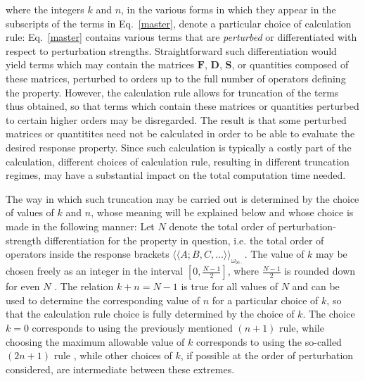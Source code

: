 \documentclass[%
 reprint,
 amsmath,amssymb,
 aps,
]{revtex4-1}
\begin{document}
where the integers $k$ and $n$, in the various forms in which they appear in the subscripts of the terms in Eq.~\eqref{master}, denote a particular choice of calculation rule: Eq.~\eqref{master} contains various terms that are \textit{perturbed} or differentiated with respect to perturbation strengths. Straightforward such differentiation would yield terms which may contain the matrices $\mathbf{F}$, $\mathbf{D}$, $\mathbf{S}$, or quantities composed of these matrices, perturbed to orders up to the full number of operators defining the property. However, the calculation rule allows for truncation of the terms thus obtained, so that terms which contain these matrices or quantities perturbed to certain higher orders may be disregarded. The result is that some perturbed matrices or quantitites need not be calculated in order to be able to evaluate the desired response property. Since such calculation is typically a costly part of the calculation, different choices of calculation rule, resulting in different truncation regimes, may have a substantial impact on the total computation time needed.

The way in which such truncation may be carried out is determined by the choice of values of $k$ and $n$, whose meaning will be explained below and whose choice is made in the following manner: Let $N$ denote the total order of perturbation-strength differentiation for the property in question, i.e. the total order of operators inside the response brackets $\langle \langle A ; B, C, \ldots \rangle \rangle_{\omega_{bc\cdots}}$. 
The value of $k$ may be chosen freely as an integer in the interval $\left[ 0, \frac{N - 1}{2} \right]$, where $\frac{N - 1}{2}$ is rounded down for even $N$ . The relation $k + n = N - 1$ is true for all values of $N$ and can be used to determine the corresponding value of $n$ for a particular choice of $k$, so that the calculation rule choice is fully determined by the choice of $k$. The choice $k = 0$ corresponds to using the previously mentioned $(n + 1)$ rule, while choosing the maximum allowable value of $k$ corresponds to using the so-called $(2n + 1)$ rule , while other choices of $k$, if possible at the order of perturbation considered, are intermediate between these extremes.
\end{document}
